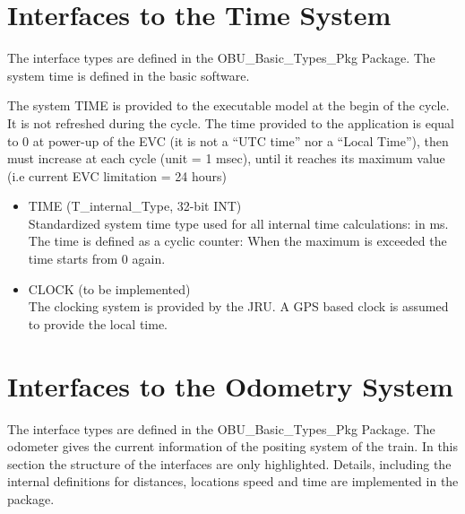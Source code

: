 \section{Interfaces to the Time System}
The interface types are defined in the OBU\_Basic\_Types\_Pkg Package. The system time is defined in the basic software.

The system TIME is provided to the executable model at the begin of the cycle. It is not refreshed during the cycle. The time provided to the application is equal to 0 at power-up of the EVC (it is not a “UTC time” nor a “Local
Time”), then must increase at each cycle (unit = 1 msec), until it reaches its maximum value (i.e current EVC
limitation = 24 hours)

\begin{itemize}
\item TIME (T\_internal\_Type, 32-bit INT)\\
Standardized system time type used for all internal time calculations: in ms. The time is defined as a cyclic counter: When the maximum is exceeded the time starts from 0 again. 

\item CLOCK (to be implemented)\\
The clocking system is provided by the JRU. A GPS based clock is assumed to provide the local time.

\end{itemize}

\section{Interfaces to the Odometry System}
The interface types are defined in the OBU\_Basic\_Types\_Pkg Package. 
The odometer gives the current information of the positing system of the train. In this section the structure of the interfaces are only highlighted. Details, including the internal definitions for distances, locations speed and time are implemented in the package. 

